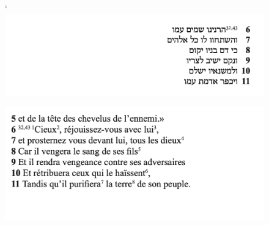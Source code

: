 \documentclass[11pt,a4paper]{article}
\begin{document}
\begin{figure}[!h]
    \begin{minipage}[c]{.46\linewidth}
        \centering`
        \includegraphics[width=1\linewidth]{img/4Q44/4Q44_2.png}
    \end{minipage}
    \hfill%
    \begin{minipage}[c]{.46\linewidth}
        \centering
        \includegraphics[width=1\linewidth]{img/4Q44/4Q44_trans_2.png}
    \end{minipage}
\end{figure}
\newpage
\end{document}

